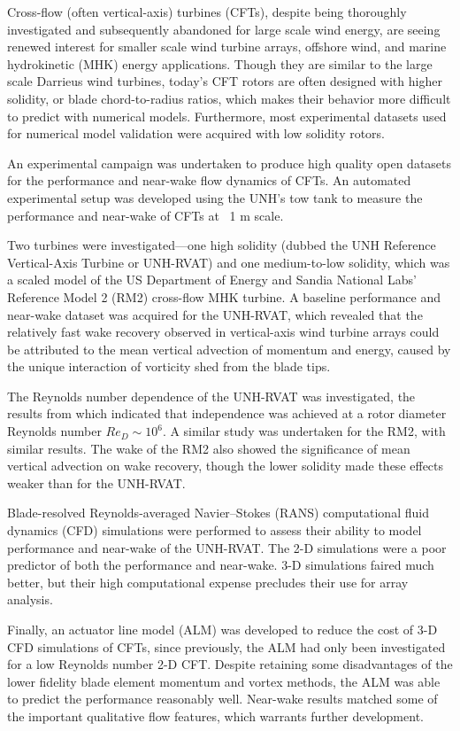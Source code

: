 \begin{Abstractpage}

\setlength{\baselineskip}{1.5\baselineskip}
{

Cross-flow (often vertical-axis) turbines (CFTs), despite being thoroughly
investigated and subsequently abandoned for large scale wind energy, are seeing
renewed interest for smaller scale wind turbine arrays, offshore wind, and
marine hydrokinetic (MHK) energy applications. Though they are similar to the
large scale Darrieus wind turbines, today's CFT rotors are often designed with
higher solidity, or blade chord-to-radius ratios, which makes their behavior
more difficult to predict with numerical models. Furthermore, most experimental
datasets used for numerical model validation were acquired with low solidity
rotors.

An experimental campaign was undertaken to produce high quality open datasets
for the performance and near-wake flow dynamics of CFTs. An automated
experimental setup was developed using the UNH's tow tank to measure the
performance and near-wake of CFTs at ~1 m scale.

Two turbines were investigated---one high solidity (dubbed the UNH Reference
Vertical-Axis Turbine or UNH-RVAT) and one medium-to-low solidity, which was a
scaled model of the US Department of Energy and Sandia National Labs' Reference
Model 2 (RM2) cross-flow MHK turbine. A baseline performance and near-wake
dataset was acquired for the UNH-RVAT, which revealed that the relatively fast
wake recovery observed in vertical-axis wind turbine arrays could be attributed
to the mean vertical advection of momentum and energy, caused by the unique
interaction of vorticity shed from the blade tips.

The Reynolds number dependence of the UNH-RVAT was investigated, the results
from which indicated that independence was achieved at a rotor diameter Reynolds
number $Re_D \sim 10^6$. A similar study was undertaken for the RM2, with
similar results. The wake of the RM2 also showed the significance of mean
vertical advection on wake recovery, though the lower solidity made these
effects weaker than for the UNH-RVAT.

Blade-resolved Reynolds-averaged Navier--Stokes (RANS) computational fluid
dynamics (CFD) simulations were performed to assess their ability to model
performance and near-wake of the UNH-RVAT. The 2-D simulations were a poor
predictor of both the performance and near-wake. 3-D simulations faired much
better, but their high computational expense precludes their use for array
analysis.

Finally, an actuator line model (ALM) was developed to reduce the cost of 3-D
CFD simulations of CFTs, since previously, the ALM had only been investigated
for a low Reynolds number 2-D CFT. Despite retaining some disadvantages of the
lower fidelity blade element momentum and vortex methods, the ALM was able to
predict the performance reasonably well. Near-wake results matched some of the
important qualitative flow features, which warrants further development.


}


\end{Abstractpage}
